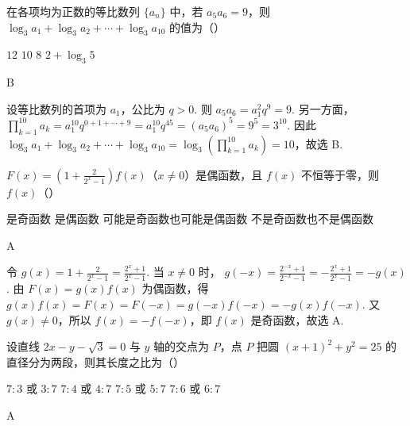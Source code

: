 \begin{problem}
在各项均为正数的等比数列 \(\{a_{n}\}\) 中，若 \(a_{5}a_{6} = 9\)，则 \(\log_{3} a_{1} + \log_{3} a_{2} + \cdots + \log_{3} a_{10}\) 的值为（\quad）

\choices
    {\(12\)}
    {\(10\)}
    {\(8\)}
    {\(2 + \log_{3} 5\)}
\end{problem}

\begin{answer}
B
\end{answer}

\begin{solution}
设等比数列的首项为 \(a_1\)，公比为 \(q>0\). 则
\(a_5a_6=a_1^2q^9=9\). 另一方面，
\(\displaystyle \prod_{k=1}^{10}a_k=a_1^{10}q^{0+1+\cdots+9}=a_1^{10}q^{45}=(a_5a_6)^5=9^5=3^{10}\). 因此
\(\displaystyle \log_3a_1+\log_3a_2+\cdots+\log_3a_{10}=\log_3\left(\prod_{k=1}^{10}a_k\right)=10\)，故选 B.
\end{solution}

\begin{problem}
\(F(x) = \left(1 + \frac{2}{2^x - 1}\right)f(x)\)（\(x\neq 0\)）是偶函数，且 \(f(x)\) 不恒等于零，则 \(f(x)\)（\quad）

\choices
    {是奇函数}
    {是偶函数}
    {可能是奇函数也可能是偶函数}
    {不是奇函数也不是偶函数}
\end{problem}

\begin{answer}
A
\end{answer}

\begin{solution}
令 \(\displaystyle g(x)=1+\frac{2}{2^x-1}=\frac{2^x+1}{2^x-1}\). 当 \(x\ne0\) 时，
\(\displaystyle g(-x)=\frac{2^{-x}+1}{2^{-x}-1}=-\frac{2^x+1}{2^x-1}=-g(x)\). 由 \(F(x)=g(x)f(x)\) 为偶函数，得
\(g(x)f(x)=F(x)=F(-x)=g(-x)f(-x)=-g(x)f(-x)\). 又 \(g(x)\ne0\)，所以 \(f(x)=-f(-x)\)，即 \(f(x)\) 是奇函数，故选 A.
\end{solution}

\begin{problem}
设直线 \(2x - y - \sqrt{3} = 0\) 与 \(y\) 轴的交点为 \(P\)，点 \(P\) 把圆 \((x + 1)^2 + y^2 = 25\) 的直径分为两段，则其长度之比为（\quad）

\choices
    {\(7:3\) 或 \(3:7\)}
    {\(7:4\) 或 \(4:7\)}
    {\(7:5\) 或 \(5:7\)}
    {\(7:6\) 或 \(6:7\)}
\end{problem}

\begin{answer}
A
\end{answer}

